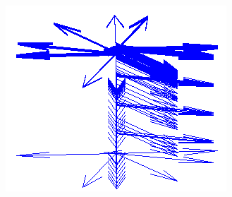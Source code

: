\documentclass[11pt]{article}
\begin{document}
\begin{figure}[!hbt]
\begin{subfigure}[h]{0.3\textwidth}
  \end{subfigure} 
   \begin{subfigure}[h]{0.3\textwidth}
    \centering
    \includegraphics[width = \textwidth]{../synth-images/normals.png}
  \end{subfigure}
  

\end{figure}
\end{document}
